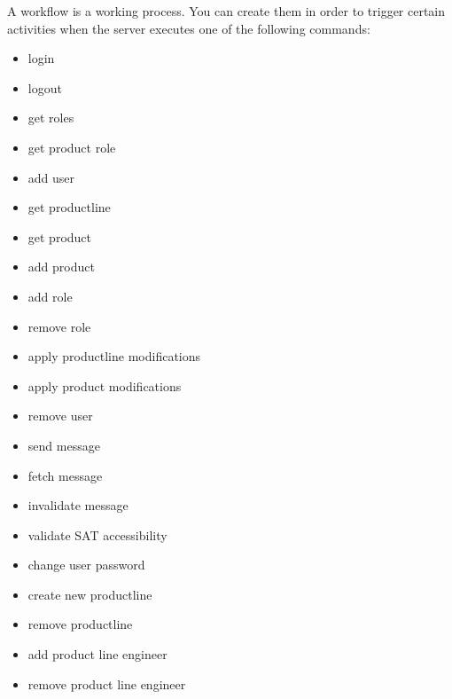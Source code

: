 A workflow is a working process. You can create them in order to trigger certain
activities when the server executes one of the following commands:

\begin{itemize}
	\item login
	\item logout
	\item get roles
	\item get product role
	\item add user
	\item get productline
	\item get product
	\item add product
	\item add role
	\item remove role
	\item apply productline modifications
	\item apply product modifications
	\item remove user
	\item send message
	\item fetch message
	\item invalidate message
	\item validate SAT accessibility
	\item change user password
	\item create new productline
	\item remove productline
	\item add product line engineer
	\item remove product line engineer
\end{itemize}